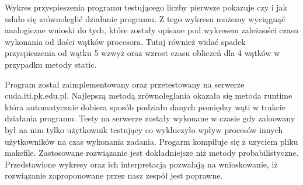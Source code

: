 \documentclass[a4paper,12pt]{article}
\begin{document}
Wykres przyspieszenia programu testującego liczby pierwsze pokazuje czy i jak udało się zrównoleglić działanie programu. Z tego wykresu możemy wyciągnąć analogiczne wnioski do tych, które zostały opisane pod wykresem zależności czasu wykonania od ilości wątków procesora. Tutaj również widać spadek przyspieszenia od wątku 5 wzwyż oraz wzrost czasu obliczeń dla 4 wątków w przypadku metody static. 
 
Program został zaimplementowany oraz przetestowany na serwerze cuda.iti.pk.edu.pl. Najlepszą metodą zrównoleglania okazała się metoda runtime która automatycznie dobiera sposób podziału danych pomiędzy wąti w trakcie działania programu. Testy na serwerze zostały wykonane w czasie gdy zaloowany był na nim tylko użytkownik testujący co wykluczyło wpływ procesów innych użytkowników na czas wykonania zadania. Progarm kompiluje się z uzyciem pliku makefile. Zastosowane rozwiązanie jest dokładniejsze niż metody probabilistyczne. Przedstawione wykresy oraz ich interpretacja pozwalają na wnioskowanie, iż rozwiązanie zaproponowane przez nasz zespół jest poprawne.
\end{document}
